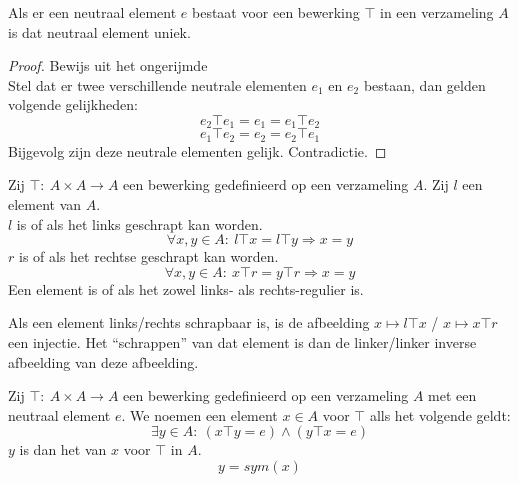 \documentclass[main.tex]{subfiles}
\begin{document}
\begin{st}
  \label{st:neutraal-element-uniek}
  Als er een neutraal element $e$ bestaat voor een bewerking $\top$ in een verzameling $A$ is dat neutraal element uniek.
  \begin{proof}
    Bewijs uit het ongerijmde\\
    Stel dat er twee verschillende neutrale elementen $e_{1}$ en $e_{2}$ bestaan, dan gelden volgende gelijkheden:    \[ e_{2}\top e_{1} = e_{1}  =e_{1}\top e_{2}\]
    \[ e_{1}\top e_{2} = e_{2}  =e_{2}\top e_{1}\]
    Bijgevolg zijn deze neutrale elementen gelijk. Contradictie.
  \end{proof}
\end{st}

\begin{de}
  Zij $\top:\ A\times A\rightarrow A$ een bewerking gedefinieerd op een verzameling $A$.
  Zij $l$ een element van $A$.\\
  $l$ is  of  als het links geschrapt kan worden.
  \[ \forall x,y \in A:\ l \top x = l \top y \Rightarrow x = y \]
  $r$ is  of  als het rechtse geschrapt kan worden.
  \[ \forall x,y \in A:\ x \top r = y \top r \Rightarrow x = y \]
  Een element is  of  als het zowel links- als rechts-regulier is. 
\end{de}

\begin{opm}
  Als een element links/rechts schrapbaar is, is de afbeelding $x \mapsto l\top x$ / $x \mapsto x\top r$ een injectie. Het ``schrappen'' van dat element is dan de linker/linker inverse afbeelding van deze afbeelding.
\end{opm}

\begin{de}
  Zij $\top:\ A\times A\rightarrow A$ een bewerking gedefinieerd op een verzameling $A$ met een neutraal element $e$.
  We noemen een element $x\in A$  voor $\top$ alls het volgende geldt:
  \[ \exists y \in A:\ (x \top y = e) \wedge (y \top x = e) \]
  $y$ is dan het  van $x$ voor $\top$ in $A$.
  \[ y = sym(x) \]
\end{de}
\end{document}
